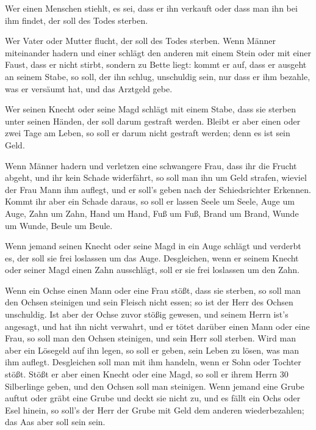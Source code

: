  Wer einen Menschen stiehlt, es sei, dass er ihn verkauft
oder dass man ihn bei ihm findet, der soll des Todes sterben.

 Wer Vater oder Mutter flucht, der soll des Todes
sterben.  Wenn Männer miteinander hadern und einer
schlägt den anderen mit einem Stein oder mit einer Faust, dass er nicht
stirbt, sondern zu Bette liegt:  kommt er auf, dass er
ausgeht an seinem Stabe, so soll, der ihn schlug, unschuldig sein, nur
dass er ihm bezahle, was er versäumt hat, und das Arztgeld gebe.

 Wer seinen Knecht oder seine Magd schlägt mit einem
Stabe, dass sie sterben unter seinen Händen, der soll darum gestraft
werden.  Bleibt er aber einen oder zwei Tage am Leben, so
soll er darum nicht gestraft werden; denn es ist sein Geld.

 Wenn Männer hadern und verletzen eine schwangere Frau,
dass ihr die Frucht abgeht, und ihr kein Schade widerfährt, so soll man
ihn um Geld strafen, wieviel der Frau Mann ihm auflegt, und er soll's
geben nach der Schiedsrichter Erkennen.  Kommt ihr aber
ein Schade daraus, so soll er lassen Seele um Seele, 
Auge um Auge, Zahn um Zahn, Hand um Hand, Fuß um Fuß, 
Brand um Brand, Wunde um Wunde, Beule um Beule.

 Wenn jemand seinen Knecht oder seine Magd in ein Auge
schlägt und verderbt es, der soll sie frei loslassen um das Auge.
 Desgleichen, wenn er seinem Knecht oder seiner Magd
einen Zahn ausschlägt, soll er sie frei loslassen um den Zahn.

 Wenn ein Ochse einen Mann oder eine Frau stößt, dass sie
sterben, so soll man den Ochsen steinigen und sein Fleisch nicht essen;
so ist der Herr des Ochsen unschuldig.  Ist aber der
Ochse zuvor stößig gewesen, und seinem Herrn ist's angesagt, und hat ihn
nicht verwahrt, und er tötet darüber einen Mann oder eine Frau, so soll
man den Ochsen steinigen, und sein Herr soll sterben. 
Wird man aber ein Lösegeld auf ihn legen, so soll er geben, sein Leben
zu lösen, was man ihm auflegt.  Desgleichen soll man mit
ihm handeln, wenn er Sohn oder Tochter stößt.  Stößt er
aber einen Knecht oder eine Magd, so soll er ihrem Herrn 30 Silberlinge
geben, und den Ochsen soll man steinigen.  Wenn jemand
eine Grube auftut oder gräbt eine Grube und deckt sie nicht zu, und es
fällt ein Ochs oder Esel hinein,  so soll's der Herr der
Grube mit Geld dem anderen wiederbezahlen; das Aas aber soll sein sein.

